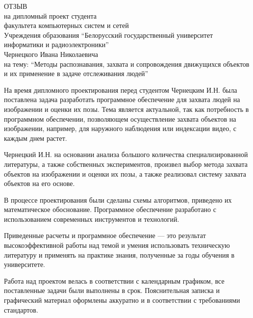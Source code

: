 \thispagestyle{empty}

\begin{singlespace}
  {\small
    \begin{center}
      \begin{minipage}{0.8\textwidth}
        \begin{center}
          {\normalsize ОТЗЫВ}\\[0.2cm]
          на дипломный проект студента\\
          факультета компьютерных систем и сетей\\
          Учреждения образования ``Белорусский государственный университет информатики и радиоэлектроники''\\
          Чернецкого Ивана Николаевича\\
          на тему: ``Методы распознавания, захвата и сопровождения движущихся объектов и их применение в задаче отслеживания людей''
        \end{center}
      \end{minipage}
    \end{center}

    На время дипломного проектирования перед студентом Чернецким И.Н. была поставлена задача разработать программное обеспечение для захвата людей на изображении и оценки их позы. Тема является актуальной, так как потребность в программном обеспечении, позволяющем осуществление захвата объектов на изображении, например, для наружного наблюдения или индексации видео, с каждым днем растет.

    Чернецкий И.Н. на основании анализа большого количества специализированной литературы, а также собственных экспериментов, произвел выбор метода захвата объектов на изображении и оценки их позы, а также реализовал систему захвата объектов на его основе.

    В процессе проектирования были сделаны схемы алгоритмов, приведено их математическое обоснование. Программное обеспечение разработано с использованием современных инструментов и технологий.

    Приведенные расчеты и программное обеспечение --- это результат высокоэффективной работы над темой и умения использовать техническую литературу и применять на практике знания, полученные за годы обучения в университете.

    Работа над проектом велась в соответствии с календарным графиком, все поставленные задачи были выполнены в срок. Пояснительная записка и графический материал оформлены аккуратно и в соответствии с требованиями стандартов.

}
\end{singlespace}
